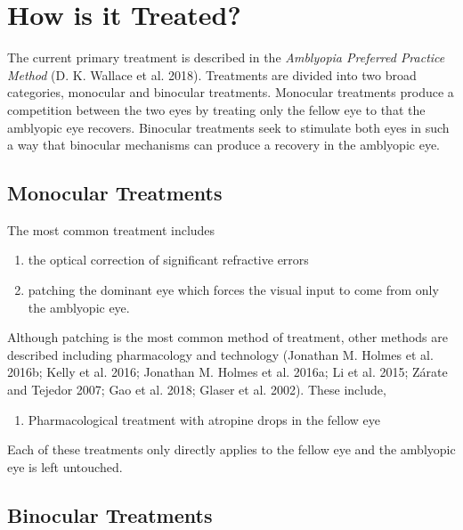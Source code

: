 \documentclass[
  letterpaper,
  DIV=11,
  numbers=noendperiod]{scrreprt}
\providecommand{\tightlist}{%
  \setlength{\itemsep}{0pt}\setlength{\parskip}{0pt}}\usepackage{longtable,booktabs,array}
\begin{document}
\hypertarget{how-is-it-treated}{%
\section{How is it Treated?}\label{how-is-it-treated}}

The current primary treatment is described in the \emph{Amblyopia
Preferred Practice Method} (D. K. Wallace et al. 2018). Treatments are
divided into two broad categories, monocular and binocular treatments.
Monocular treatments produce a competition between the two eyes by
treating only the fellow eye to that the amblyopic eye recovers.
Binocular treatments seek to stimulate both eyes in such a way that
binocular mechanisms can produce a recovery in the amblyopic eye.

\hypertarget{monocular-treatments}{%
\subsection{Monocular Treatments}\label{monocular-treatments}}

The most common treatment includes

\begin{enumerate}
\def\labelenumi{\arabic{enumi}.}
\tightlist
\item
  the optical correction of significant refractive errors
\item
  patching the dominant eye which forces the visual input to come from
  only the amblyopic eye.
\end{enumerate}

Although patching is the most common method of treatment, other methods
are described including pharmacology and technology (Jonathan M. Holmes
et al. 2016b; Kelly et al. 2016; Jonathan M. Holmes et al. 2016a; Li et
al. 2015; Zárate and Tejedor 2007; Gao et al. 2018; Glaser et al. 2002).
These include,

\begin{enumerate}
\def\labelenumi{\arabic{enumi}.}
\setcounter{enumi}{2}
\tightlist
\item
  Pharmacological treatment with atropine drops in the fellow eye
\end{enumerate}

Each of these treatments only directly applies to the fellow eye and the
amblyopic eye is left untouched.

\hypertarget{binocular-treatments}{%
\subsection{Binocular Treatments}\label{binocular-treatments}}
\end{document}
